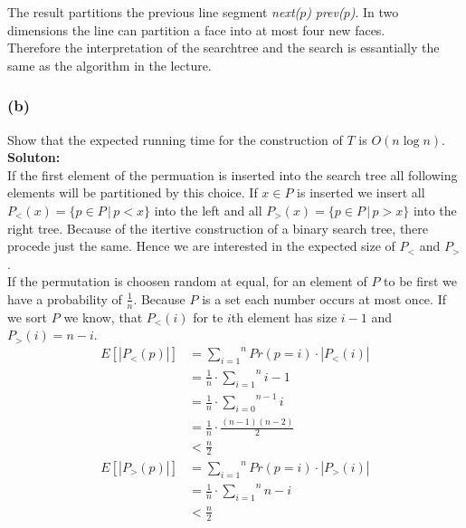 \documentclass[11pt,a4paper,ngerman]{article}
\begin{document}
The result partitions the previous line segment \emph{next($p$)} \emph{prev($p$)}. In two dimensions the line
can partition a face into at most four new faces.\\

Therefore the interpretation of the searchtree and the search is essantially the same as the algorithm in the lecture.

\subsubsection*{(b)}

Show that the expected running time for the construction of $T$ is $O(n \log n)$.\\

\textbf{Soluton:}\\

If the first element of the permuation is inserted into the search tree all following elements will be partitioned by
this choice. If $x \in P$ is inserted we insert all $P_<(x) = \{ p \in P \, | \, p < x \}$ into the left and
all $P_>(x) = \{ p \in P \, | \, p > x \}$ into the right tree. Because of the itertive construction of a binary search tree,
there procede just the same. Hence we are interested in the expected size of $P_<$ and $P_>$.\\

If the permutation is choosen random at equal, for an element of $P$ to be first we have a probability of $\frac{1}{n}$.
Because $P$ is a set each number occurs at most once. If we sort $P$ we know, that $P_<(i)$ for te $i$th element
has size $i-1$ and $P_>(i) = n-i$.
\begin{equation*}\begin{split}
    E[|P_<(p)|] &= \overset{n}{\underset{i=1}{\sum}} Pr(p = i) \cdot |P_<(i)|\\
                &= \frac{1}{n} \cdot \overset{n}{\underset{i=1}{\sum}} i-1\\
                &= \frac{1}{n} \cdot \overset{n-1}{\underset{i=0}{\sum}} i\\
                &= \frac{1}{n} \cdot \frac{(n-1)(n-2)}{2}\\
                &< \frac{n}{2}\\
    E[|P_>(p)|] &= \overset{n}{\underset{i=1}{\sum}} Pr(p=i) \cdot |P_>(i)|\\
                &= \frac{1}{n} \cdot \overset{n}{\underset{i=1}{\sum}} n-i\\
                &< \frac{n}{2}
\end{split}\end{equation*}
\end{document}
